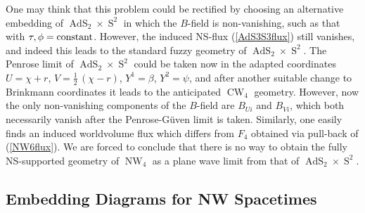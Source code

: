 \documentclass[11pt,a4paper]{article}
\DeclareMathOperator{\AdS}{AdS}
\DeclareMathOperator{\Sphere}{S}
\DeclareMathOperator{\NW}{NW}
\DeclareMathOperator{\CW}{CW}
\let\S\Sphere
\begin{document}
One may think that this problem could be rectified by choosing
an alternative embedding of $\AdS_2\times\S^2$ in which the $B$-field
is non-vanishing, such as that with $\tau,\phi={\rm
  constant}$. However, the induced NS-flux (\ref{AdS3S3flux}) still
vanishes, and indeed this leads to the standard fuzzy geometry of
$\AdS_2\times\S^2$. The Penrose limit of $\AdS_2\times\S^2$ could be
taken now in the adapted coordinates $U=\chi+r$, $V=\frac12\,(\chi-r)$,
$Y^1=\beta$, $Y^2=\psi$, and after another suitable change to
Brinkmann coordinates it leads to the anticipated $\CW_4$
geometry. However, now the only non-vanishing components of the
$B$-field are $B_{Ui}$ and $B_{Vi}$, which both necessarily vanish
after the Penrose-G\"uven limit is taken. Similarly, one easily finds
an induced worldvolume flux which differs from $F_4$ obtained via
pull-back of (\ref{NW6flux}). We are forced to conclude that there is
no way to obtain the fully NS-supported geometry of $\NW_4$ as a plane
wave limit from that of $\AdS_2\times\S^2$.

\subsection{Embedding Diagrams for NW Spacetimes\label{DiagNW}}
\end{document}
